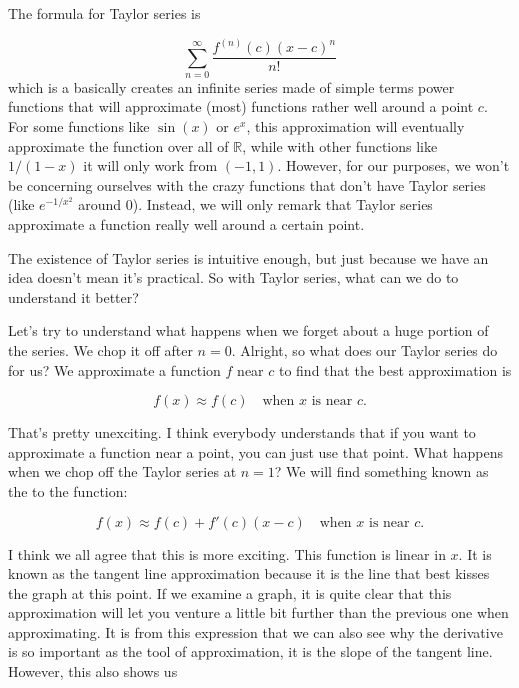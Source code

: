 \documentclass[11pt]{scrartcl}
\begin{document}
	The formula for Taylor series is 

\[
\sum_{n=0}^{\infty}\frac{f^{(n)}(c)(x-c)^n}{n!}
\]
which is a basically creates an infinite series made of simple terms power functions that will approximate (most) functions rather well around a point $c.$ For some functions like $\sin(x)$ or $e^x$, this approximation will eventually approximate the function over all of $\mathbb{R}$, while with other functions like $1/(1-x)$ it will only work from $(-1,1)$. However, for our purposes, we won't be concerning ourselves with the crazy functions that don't have Taylor series (like $e^{-1/x^2}$ around $0$). Instead, we will only remark that Taylor series approximate a function really well around a certain point. 

	The existence of Taylor series is intuitive enough, but just because we have an idea doesn't mean it's practical. So with Taylor series, what can we do to understand it better?

	Let's try to understand what happens when we forget about a huge portion of the series. We chop it off after $n=0$. Alright, so what does our Taylor series do for us? We approximate a function $f$ near $c$ to find that the best approximation is

\[
f(x) \approx f(c) \quad \text{when $x$ is near $c.$}
\]


	That's pretty unexciting. I think everybody understands that if you want to approximate a function near a point, you can just use that point. What happens when we chop off the Taylor series at $n=1$? We will find something known as the  to the function:

\[
f(x) \approx f(c) + f'(c)(x-c) \quad \text{when $x$ is near $c.$}
\] 

	I think we all agree that this is more exciting. This function is linear in $x$. It is known as the tangent line approximation because it is the line that best kisses the graph at this point. If we examine a graph, it is quite clear that this approximation will let you venture a little bit further than the previous one when approximating. It is from this expression that we can also see why the derivative is so important as the tool of approximation, it is the slope of the tangent line. However, this also shows us 

	


 
\end{document}
